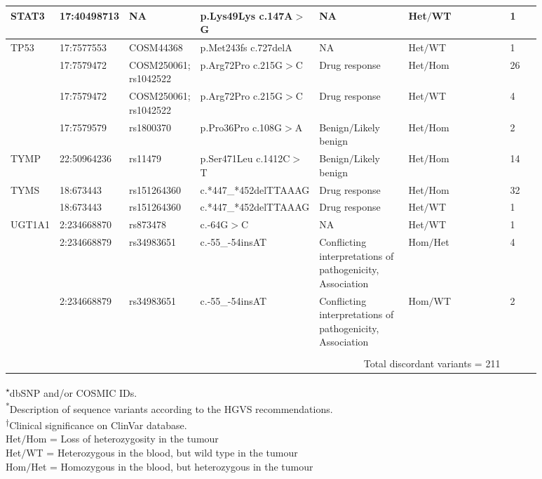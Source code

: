 \begin{landscape}
\begin{longtable}{p{0.09\linewidth}|p{0.1\linewidth}p{0.12\linewidth}p{0.14\linewidth}p{0.17\linewidth}p{0.2\linewidth}p{0.06\linewidth}}
		\\
		\hline
		STAT3 & 17:40498713 & NA & p.Lys49Lys c.147A$>$G & NA & Het$/$WT & 1
		\\
		\hline
		TP53 & 17:7577553 & COSM44368 & p.Met243fs c.727delA & NA & Het$/$WT & 1
		\\
		& 17:7579472 & COSM250061; rs1042522 & p.Arg72Pro c.215G$>$C & Drug response & Het$/$Hom & 26
		\\
		& 17:7579472 & COSM250061; rs1042522 & p.Arg72Pro c.215G$>$C & Drug response & Het$/$WT & 4
		\\
		& 17:7579579 & rs1800370 & p.Pro36Pro c.108G$>$A & Benign$/$Likely benign & Het$/$Hom & 2
		\\
		\hline
		TYMP & 22:50964236 & rs11479 & p.Ser471Leu c.1412C$>$T & Benign$/$Likely benign & Het$/$Hom & 14
		\\
		\hline
		TYMS & 18:673443 & rs151264360 & \footnotesize{c.*447\_*452delTTAAAG} & Drug response & Het$/$Hom & 32
		\\
		& 18:673443 & rs151264360 & \footnotesize{c.*447\_*452delTTAAAG} & Drug response & Het$/$WT & 1
		\\
		\hline
		UGT1A1 & 2:234668870 & rs873478 & c.-64G$>$C & NA & Het$/$WT & 1
		\\
		& 2:234668879 & rs34983651 & c.-55\_-54insAT & Conflicting interpretations of pathogenicity, Association & Hom$/$Het & 4
		\\
		& 2:234668879 & rs34983651 & c.-55\_-54insAT & Conflicting interpretations of pathogenicity, Association & Hom$/$WT & 2
		\\
		\hline
		\\
		&
		\multicolumn{5}{r}{Total discordant variants = 211}
		&
		\\
		\hline
\end{longtable}

\noindent\textsuperscript{$\star$}dbSNP and/or COSMIC IDs.
\\
\textsuperscript{*}Description of sequence variants according to the HGVS recommendations.
\\
\textsuperscript{$\dagger$}Clinical significance on ClinVar database.
\\
Het$/$Hom = Loss of heterozygosity in the tumour
\\
Het$/$WT = Heterozygous in the blood, but wild type in the tumour
\\
Hom$/$Het = Homozygous in the blood, but heterozygous in the tumour

\end{landscape}

